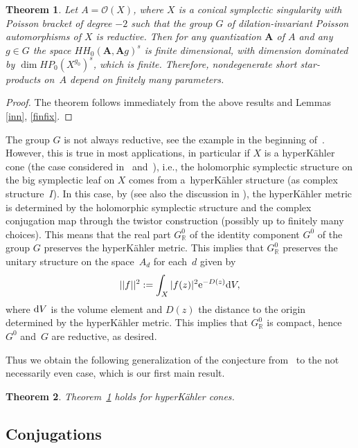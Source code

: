 \documentclass[pdftex]{sigma}
\numberwithin{equation}{section}
\newtheorem{Theorem}{Theorem}[section]
\begin{document}
\begin{Theorem}\label{finde3} Let $A=\mathcal{O}(X)$, where $X$ is a conical symplectic singularity
with Poisson bracket of degree $-2$ such that the group $G$ of dilation-invariant Poisson automorphisms of $X$ is reductive. Then for any quantization ${\mathbf A}$ of $A$ and any $g\in G$ the space $HH_0({\mathbf A},{\mathbf A}g)^s$ is finite dimensional, with dimension dominated by $\dim HP_0(X^{g_0})^s$, which is finite. Therefore, nondegenerate short star-products on~$A$ depend on finitely many parameters.
\end{Theorem}

\begin{proof}The theorem follows immediately from the above results and Lemmas \ref{inn}, \ref{finfix}.
\end{proof}

The group $G$ is not always reductive, see the example in the beginning of~\cite{Na2}. However, this is true in most applications, in particular if $X$ is a hyperK\"ahler cone (the case considered in~\cite{BPR} and~\cite{DPY}), i.e., the holomorphic symplectic structure on the big symplectic leaf on $X$ comes from a~hyperK\"ahler structure (as complex structure~$I$). In this case, by \cite[Theorem~3.3]{HKLR} (see also the discussion in \cite[p.~22]{GNT}), the hyperK\"ahler metric is determined by the holomorphic symplectic structure and the complex conjugation map through the twistor construction (possibly up to finitely many choices). This means that the real part $G^0_{{\mathbb R}}$ of the identity component $G^0$ of the group $G$ preserves the hyperK\"ahler metric. This implies that $G^0_{{\mathbb R}}$ preserves the unitary structure on the space~$A_d$ for each~$d$ given by
\begin{gather*}
||f||^2:=\int_X |f(z)|^2{\rm e}^{-D(z)}{\rm d}V,
\end{gather*}
where ${\rm d}V$ is the volume element and $D(z)$ the distance to the origin determined by the hyperK\"ahler metric. This implies that $G^0_{{\mathbb R}}$ is compact, hence~$G^0$ and~$G$ are reductive, as desired.

Thus we obtain the following generalization of the conjecture from~\cite{BPR} to the not necessarily even case, which is our first main result.

\begin{Theorem}\label{main1}Theorem~{\rm \ref{finde3}} holds for hyperK\"ahler cones.
\end{Theorem}

\subsection{Conjugations}
\end{document}
